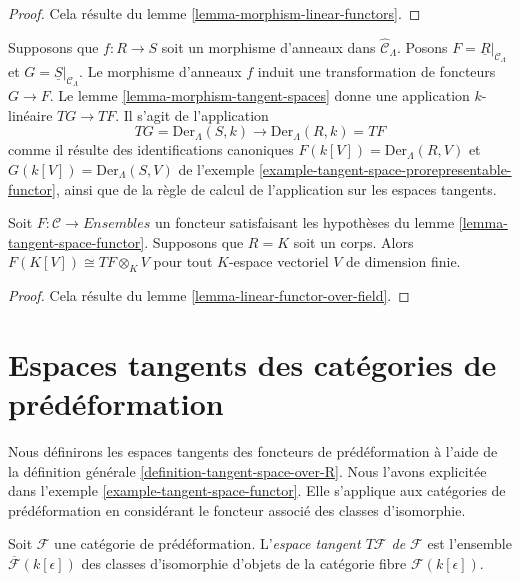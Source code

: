 \begin{proof}
Cela résulte du lemme \ref{lemma-morphism-linear-functors}.
\end{proof}

\begin{example}
\label{example-tangent-space-map-prorepresentable-functor}
Supposons que $f : R \to S$ soit un morphisme d'anneaux dans
$\widehat{\mathcal{C}}_\Lambda$. Posons
$F = \underline{R}|_{\mathcal{C}_\Lambda}$ et
$G = \underline{S}|_{\mathcal{C}_\Lambda}$. Le morphisme d'anneaux $f$ induit
une transformation de foncteurs $G \to F$. Le lemme
\ref{lemma-morphism-tangent-spaces} donne une application $k$-linéaire
$TG \to TF$. Il s'agit de l'application
$$
TG = \text{Der}_\Lambda(S, k) \longrightarrow \text{Der}_\Lambda(R, k) = TF
$$
comme il résulte des identifications canoniques
$F(k[V]) = \text{Der}_\Lambda(R, V)$ et
$G(k[V]) = \text{Der}_\Lambda(S, V)$ de l'exemple
\ref{example-tangent-space-prorepresentable-functor}, ainsi que de la règle de
calcul de l'application sur les espaces tangents.
\end{example}

\begin{lemma}
\label{lemma-tangent-space-tensor}
Soit $F: \mathcal{C} \to \textit{Ensembles}$ un foncteur satisfaisant les
hypothèses du lemme \ref{lemma-tangent-space-functor}. Supposons que $R = K$
soit un corps. Alors $F(K[V]) \cong TF \otimes_K V$ pour tout $K$-espace
vectoriel $V$ de dimension finie.
\end{lemma}

\begin{proof}
Cela résulte du lemme \ref{lemma-linear-functor-over-field}.
\end{proof}






\section{Espaces tangents des catégories de prédéformation}
\label{section-tangent-spaces}

\noindent
Nous définirons les espaces tangents des foncteurs de prédéformation à l'aide
de la définition générale \ref{definition-tangent-space-over-R}. Nous l'avons
explicitée dans l'exemple \ref{example-tangent-space-functor}. Elle s'applique
aux catégories de prédéformation en considérant le foncteur associé des
classes d'isomorphie.

\begin{definition}
\label{definition-tangent-space}
Soit $\mathcal{F}$ une catégorie de prédéformation. L'{\it espace tangent
$T \mathcal{F}$ de $\mathcal{F}$} est l'ensemble
$\overline{\mathcal{F}}(k[\epsilon])$ des classes d'isomorphie d'objets de la
catégorie fibre $\mathcal
F(k[\epsilon])$.
\end{definition}

